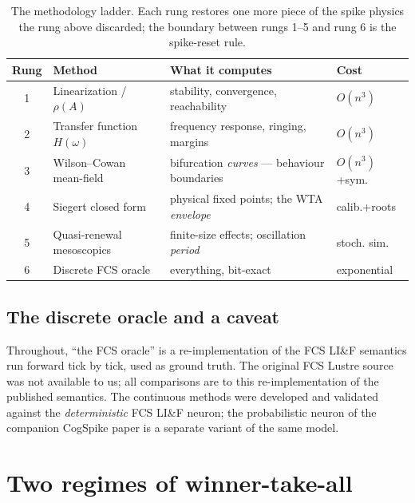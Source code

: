 \documentclass[conference]{IEEEtran}
\begin{document}
\begin{table}[t]
\caption{The methodology ladder. Each rung restores one more piece of the spike
physics the rung above discarded; the boundary between rungs 1--5 and rung 6 is
the spike-reset rule.}
\label{tbl:ladder}
\centering
\begin{tabular}{|c|l|l|l|}
\hline
\textbf{Rung} & \textbf{Method} & \textbf{What it computes} & \textbf{Cost} \\
\hline
1 & Linearization / $\rho(A)$ & stability, convergence, reachability & $O(n^3)$ \\
\hline
2 & Transfer function $H(\omega)$ & frequency response, ringing, margins & $O(n^3)$ \\
\hline
3 & Wilson--Cowan mean-field & bifurcation \emph{curves} --- behaviour boundaries & $O(n^3)$+sym. \\
\hline
4 & Siegert closed form & physical fixed points; the WTA \emph{envelope} & calib.+roots \\
\hline
5 & Quasi-renewal mesoscopics & finite-size effects; oscillation \emph{period} & stoch. sim. \\
\hline
6 & Discrete FCS oracle & everything, bit-exact & exponential \\
\hline
\end{tabular}
\end{table}

\subsection{The discrete oracle and a caveat}\label{sec:oracle}

Throughout, ``the FCS oracle'' is a re-implementation of the FCS LI\&F
semantics run forward tick by tick, used as ground truth. The original FCS
Lustre source was not available to us; all comparisons are to this
re-implementation of the published semantics. The continuous methods were
developed and validated against the \emph{deterministic} FCS LI\&F neuron; the
probabilistic neuron of the companion CogSpike paper \cite{cogspike_wd} is a
separate variant of the same model.

\section{Two regimes of winner-take-all}\label{sec:wta}
\end{document}
